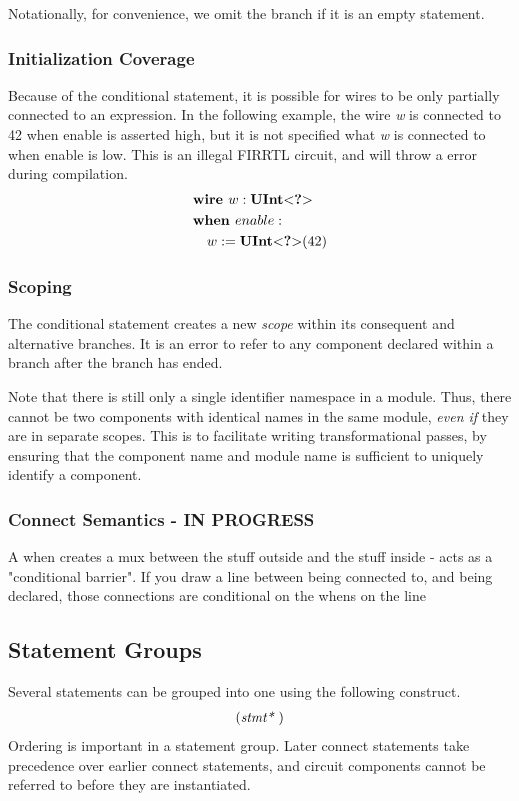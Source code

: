 \documentclass[12pt]{article}
\begin{document}
Notationally, for convenience, we omit the  branch if it is an empty statement. 

\subsubsection{Initialization Coverage}
Because of the conditional statement, it is possible for wires to be only partially connected to an expression.
In the following example, the wire {\em w} is connected to 42 when enable is asserted high, but it is not specified what {\em w} is connected to when enable is low.
This is an illegal FIRRTL circuit, and will throw a  error during compilation.
\[
\begin{aligned}
&\text{\bf wire\ } w : \text{\bf UInt}\text{\bf $<$} \text{\bf ?} \text{\bf $>$} \\
&\text{\bf when\ } enable : \\
&\quad w := \text{\bf UInt}\text{\bf $<$} \text{\bf ?} \text{\bf $>$}(42) \\
\end{aligned}
\]

\subsubsection{Scoping}
The conditional statement creates a new {\em scope} within its consequent and alternative branches.
It is an error to refer to any component declared within a branch after the branch has ended.

Note that there is still only a single identifier namespace in a module.
Thus, there cannot be two components with identical names in the same module, {\em even if} they are in separate scopes.
This is to facilitate writing transformational passes, by ensuring that the component name and module name is sufficient to uniquely identify a component.

\subsubsection{Connect Semantics - IN PROGRESS}
A when creates a mux between the stuff outside and the stuff inside - acts as a "conditional barrier".
If you draw a line between being connected to, and being declared, those connections are conditional on the whens on the line

\subsection{Statement Groups}
Several statements can be grouped into one using the following construct.
\[
\begin{aligned}
(\text{\em stmt*\ })
\end{aligned}
\]
Ordering is important in a statement group.
Later connect statements take precedence over earlier connect statements, and circuit components cannot be referred to before they are instantiated.
\end{document}
